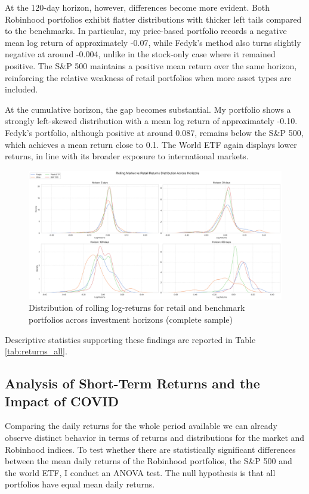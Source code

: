 At the 120-day horizon, however, differences become more evident. 
Both Robinhood portfolios exhibit flatter distributions with thicker left tails compared to the benchmarks. 
In particular, my price-based portfolio records a negative mean log return of approximately -0.07, while Fedyk's method also turns slightly negative at around -0.004, unlike in the stock-only case where it remained positive. 
The S\&P 500 maintains a positive mean return over the same horizon, reinforcing the relative weakness of retail portfolios when more asset types are included.

At the cumulative horizon, the gap becomes substantial. My portfolio shows a strongly left-skewed distribution with a mean log return of approximately -0.10.
Fedyk's portfolio, although positive at around 0.087, remains below the S\&P 500, which achieves a mean return close to 0.1. 
The World ETF again displays lower returns, in line with its broader exposure to international markets.
\begin{figure}[H]
    \centering
    \includegraphics[width=1\linewidth]
    {../images/distributions/comparison_2.png}
    \caption{Distribution of rolling log-returns for retail and benchmark portfolios across investment horizons (complete sample)}
\end{figure}

Descriptive statistics supporting these findings are reported in Table \ref{tab:returns_all}.

\subsection{Analysis of Short-Term Returns and the Impact of COVID}
Comparing the daily returns for the whole period available we can already observe distinct behavior in terms of returns and distributions for the market and Robinhood indices.
To test whether there are statistically significant differences between the mean daily returns of the Robinhood portfolios, the S\&P 500 and the world ETF, I conduct an ANOVA test.
The null hypothesis is that all portfolios have equal mean daily returns.

